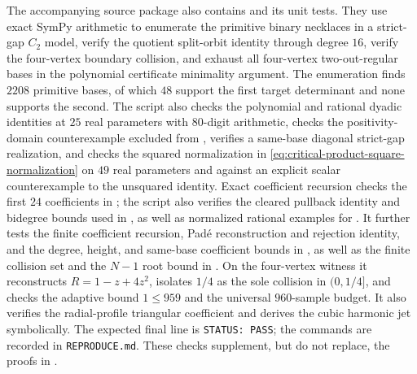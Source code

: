 The accompanying source package also contains
 and its unit tests.  They use exact
SymPy arithmetic to enumerate the primitive binary necklaces in a strict-gap
\(C_2\) model, verify the quotient split-orbit identity through degree \(16\),
verify the four-vertex boundary collision, and exhaust all four-vertex
two-out-regular bases in the polynomial certificate minimality argument.  The
enumeration finds \(2208\) primitive bases, of which \(48\) support the first
target determinant and none supports the second.  The script also checks the
polynomial and rational dyadic identities at \(25\) real parameters with
\(80\)-digit arithmetic, checks the positivity-domain counterexample excluded
from , verifies a same-base diagonal
strict-gap realization, and checks the squared normalization in
\eqref{eq:critical-product-square-normalization} on \(49\) real parameters and
against an explicit scalar counterexample to the unsquared identity.  Exact
coefficient recursion checks
the first \(24\) coefficients in ; the
script also verifies the cleared pullback identity and bidegree bounds used in
, as well as normalized rational
examples for .  It further tests the
finite coefficient recursion, Pad\'e reconstruction and rejection identity,
and the degree, height, and same-base coefficient bounds in
,
as well as the finite collision set and the \(N-1\) root bound in
.  On the four-vertex witness it reconstructs
\(R=1-z+4z^2\), isolates \(1/4\) as the sole collision in
\((0,1/4]\), and checks the adaptive bound \(1\le959\) and the universal
\(960\)-sample budget.  It also verifies the radial-profile triangular
coefficient and derives the cubic harmonic jet symbolically.  The
expected final line is
\texttt{STATUS: PASS}; the commands are recorded in \texttt{REPRODUCE.md}.
These checks supplement, but do not replace, the proofs in
.
